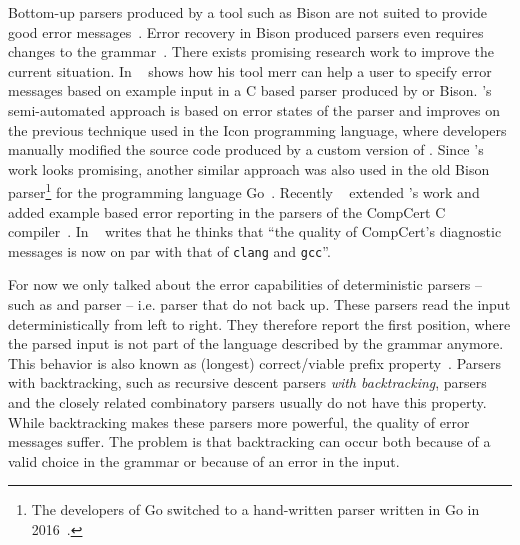 Bottom-up parsers produced by a tool such as Bison are not suited to provide good error messages~\cite{jeffery2003generating}. Error recovery in Bison produced parsers even requires changes to the grammar~\cite{donnelly2019bison}. There exists promising research work to improve the current situation. In ~\cite{jeffery2003generating}  \citeauthor{jeffery2003generating} shows how his tool merr can help a user to specify error messages based on example input in a C based parser produced by  or Bison. \citeauthor{jeffery2003generating}’s semi-automated approach is based on error states of the parser and improves on the previous technique used in the Icon programming language, where developers manually modified the source code produced by a custom version of . Since  \citeauthor{jeffery2003generating}’s work looks promising, another similar approach was also used in the old Bison parser\footnote{The developers of Go switched to a hand-written parser written in Go in 2016~\cite{pike2017reddit, go2016release}.} for the programming language Go~\cite{cox2010errors}. Recently \citeauthor{pottier2016reachability}~\cite{pottier2016reachability} extended \citeauthor{jeffery2003generating}’s work and added example based error reporting in the  parsers of the CompCert C compiler~\cite{kaestner2018compcert}. In  \citeauthor{pottier2016reachability}~\cite{pottier2016reachability} writes that he thinks that “the quality of CompCert’s diagnostic messages is now on par with that of \texttt{clang} and \texttt{gcc}”.

For now we only talked about the error capabilities of deterministic parsers – such as  and  parser – i.e. parser that do not back up. These parsers read the input deterministically from left to right. They therefore report the first position, where the parsed input is not part of the language described by the grammar anymore. This behavior is also known as (longest) correct/viable prefix property~\cite{sippu1990parsing, ruefenacht2016error, maidl2016labeled, pottier2016reachability}. Parsers with backtracking, such as recursive descent parsers \emph{with backtracking},  parsers and the closely related combinatory parsers usually do not have this property. While backtracking makes these parsers more powerful, the quality of error messages suffer. The problem is that backtracking can occur both because of a valid choice in the grammar or because of an error in the input.


